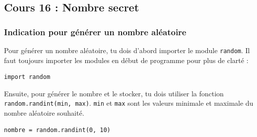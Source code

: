 \documentclass[11pt]{article}
\begin{document}
\subsection*{Cours 16 : Nombre secret}
\label{chapitre6_cours16}
\subsubsection*{Indication pour générer un nombre aléatoire}
\label{sec:org186af80}
Pour générer un nombre aléatoire, tu dois d'abord importer le module \texttt{random}. Il faut toujours importer les modules en début de programme pour plus de clarté :
\begin{verbatim}
import random
\end{verbatim}

Ensuite, pour générer le nombre et le stocker, tu dois utiliser la fonction \texttt{random.randint(min, max)}. \texttt{min} et \texttt{max} sont les valeurs minimale et maximale du nombre aléatoire souhaité.
\begin{verbatim}
nombre = random.randint(0, 10)
\end{verbatim}
\end{document}
